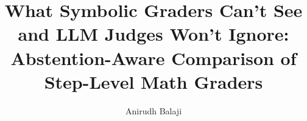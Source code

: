 \documentclass[11pt]{article}
\title{What Symbolic Graders Can't See and {LLM} Judges Won't Ignore:
Abstention-Aware Comparison of Step-Level Math Graders}
\author{Anirudh Balaji}
\begin{document}
\maketitle

\begin{abstract}

\end{abstract}












\appendix

\end{document}
